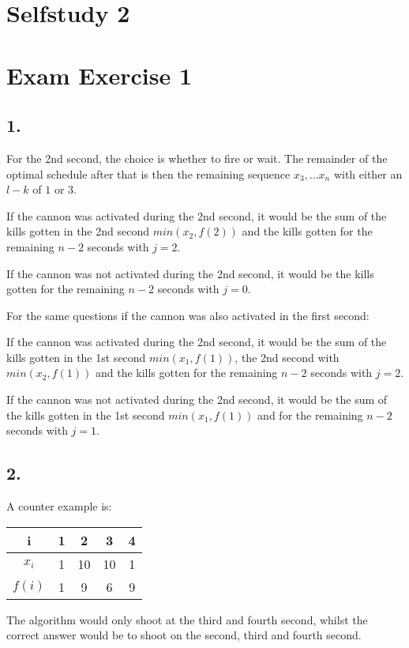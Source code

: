 \documentclass[12pt,a4paper]{report}
\begin{document}
\section*{Selfstudy 2}
\section*{Exam Exercise 1}
\subsection*{1.}

For the 2nd second, the choice is whether to fire or wait. The remainder of the optimal schedule after that is then the remaining sequence $x_3,...x_n$ with either an $l-k$ of $1$ or $3$.

If the cannon was activated during the 2nd second, it would be the sum of the kills gotten in the 2nd second $min(x_2,f(2))$ and the kills gotten for the remaining $n-2$ seconds with $j=2$.

If the cannon was not activated during the 2nd second, it would be the kills gotten for the remaining $n-2$ seconds with $j=0$.

For the same questions if the cannon was also activated in the first second:

If the cannon was activated during the 2nd second, it would be the sum of the kills gotten in the 1st second $min(x_1,f(1))$, the 2nd second with $min(x_2,f(1))$ and the kills gotten for the remaining $n-2$ seconds with $j=2$.

If the cannon was not activated during the 2nd second, it would be the sum of the kills gotten in the 1st second $min(x_1,f(1))$ and for the remaining $n-2$ seconds with $j=1$.

\subsection*{2.}
A counter example is:
\begin{tabular}{|c|c|c|c|c|}
\hline 
i & 1 & 2 & 3 & 4 \\ 
\hline 
$x_i$ & 1 & 10 & 10 & 1 \\ 
\hline 
$f(i)$ & 1 & 9 & 6 & 9 \\ 
\hline 
\end{tabular}

The algorithm would only shoot at the third and fourth second, whilst the correct answer would be to shoot on the second, third and fourth second.
\end{document}
